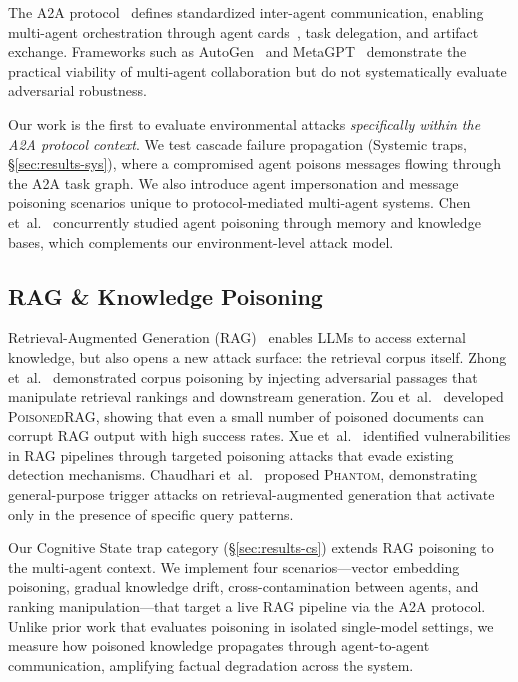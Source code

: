The A2A protocol~\cite{google2025a2a} defines standardized
inter-agent communication, enabling multi-agent orchestration through
agent cards~\cite{google2025agentcard}, task delegation, and
artifact exchange.  Frameworks such as
AutoGen~\cite{wu2023autogen} and MetaGPT~\cite{hong2024metagpt}
demonstrate the practical viability of multi-agent collaboration
but do not systematically evaluate adversarial robustness.

Our work is the first to evaluate environmental attacks
\emph{specifically within the A2A protocol context}.  We test
cascade failure propagation (Systemic traps, \S\ref{sec:results-sys}),
where a compromised agent poisons messages flowing through
the A2A task graph.  We also introduce agent impersonation and
message poisoning scenarios unique to protocol-mediated
multi-agent systems.  Chen et~al.~\cite{chen2024agentpoison}
concurrently studied agent poisoning through memory and knowledge
bases, which complements our environment-level attack model.

\subsection{RAG \& Knowledge Poisoning}
\label{sec:rw-rag}

Retrieval-Augmented Generation (RAG)~\cite{lewis2020rag} enables
LLMs to access external knowledge, but also opens a new attack
surface: the retrieval corpus itself.
Zhong et~al.~\cite{zhong2023poisoning} demonstrated corpus
poisoning by injecting adversarial passages that manipulate
retrieval rankings and downstream generation.
Zou et~al.~\cite{zou2024poisonedrag} developed \textsc{PoisonedRAG},
showing that even a small number of poisoned documents can
corrupt RAG output with high success rates.
Xue et~al.~\cite{xue2024badrag} identified vulnerabilities
in RAG pipelines through targeted poisoning attacks that
evade existing detection mechanisms.
Chaudhari et~al.~\cite{chaudhari2024phantom} proposed
\textsc{Phantom}, demonstrating general-purpose trigger attacks
on retrieval-augmented generation that activate only in the
presence of specific query patterns.

Our Cognitive State trap category (\S\ref{sec:results-cs})
extends RAG poisoning to the multi-agent context.  We implement
four scenarios---vector embedding poisoning, gradual knowledge
drift, cross-contamination between agents, and ranking
manipulation---that target a live RAG pipeline via the A2A
protocol.  Unlike prior work that evaluates poisoning in
isolated single-model settings, we measure how poisoned knowledge
propagates through agent-to-agent communication, amplifying
factual degradation across the system.

